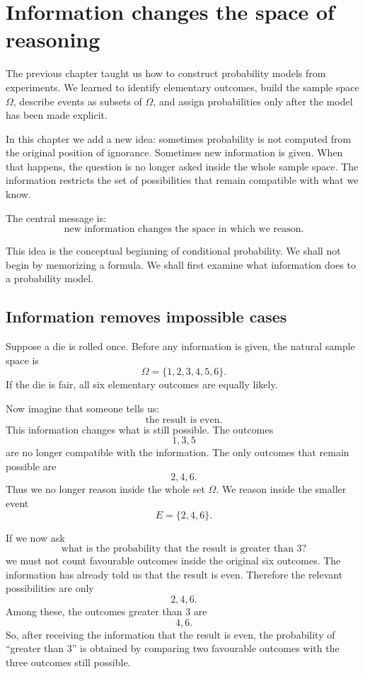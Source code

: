 \section{Information changes the space of reasoning}

The previous chapter taught us how to construct probability models from
experiments. We learned to identify elementary outcomes, build the sample space
\(\Omega\), describe events as subsets of \(\Omega\), and assign probabilities
only after the model has been made explicit.

In this chapter we add a new idea: sometimes probability is not computed from
the original position of ignorance. Sometimes new information is given. When
that happens, the question is no longer asked inside the whole sample space.
The information restricts the set of possibilities that remain compatible with
what we know.

The central message is:
\[
\text{new information changes the space in which we reason.}
\]

This idea is the conceptual beginning of conditional probability. We shall not
begin by memorizing a formula. We shall first examine what information does to a
probability model.

\subsection*{Information removes impossible cases}

Suppose a die is rolled once. Before any information is given, the natural sample
space is
\[
\Omega=\{1,2,3,4,5,6\}.
\]
If the die is fair, all six elementary outcomes are equally likely.

Now imagine that someone tells us:
\[
\text{the result is even.}
\]
This information changes what is still possible. The outcomes
\[
1,3,5
\]
are no longer compatible with the information. The only outcomes that remain
possible are
\[
2,4,6.
\]
Thus we no longer reason inside the whole set \(\Omega\). We reason inside the
smaller event
\[
E=\{2,4,6\}.
\]

If we now ask
\[
\text{what is the probability that the result is greater than }3?
\]
we must not count favourable outcomes inside the original six outcomes. The
information has already told us that the result is even. Therefore the relevant
possibilities are only
\[
2,4,6.
\]
Among these, the outcomes greater than \(3\) are
\[
4,6.
\]
So, after receiving the information that the result is even, the probability of
``greater than \(3\)'' is obtained by comparing two favourable outcomes with the
three outcomes still possible.

